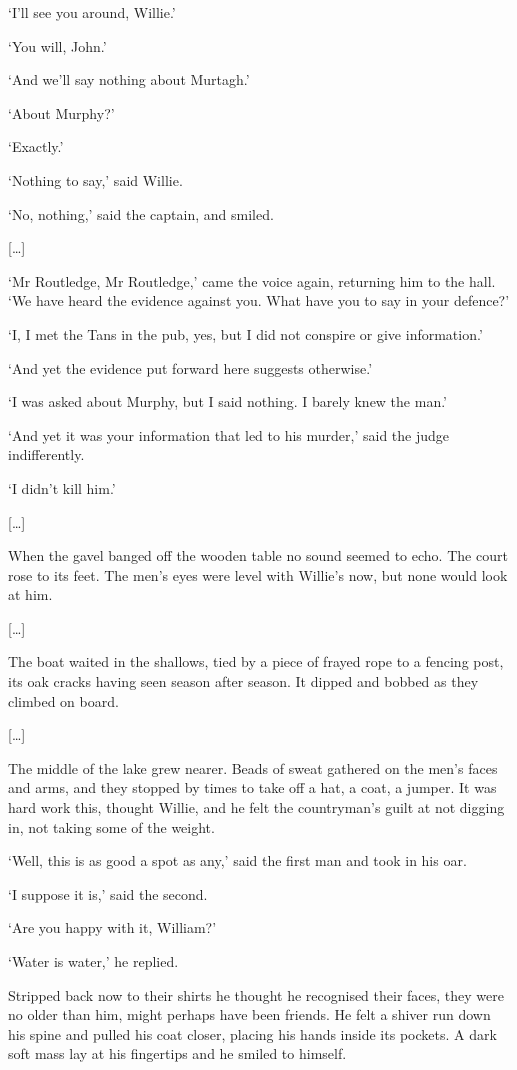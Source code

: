 \documentclass[10pt,a4paper]{article}
\begin{document}
‘I’ll see you around, Willie.’

‘You will, John.’

‘And we’ll say nothing about Murtagh.’

‘About Murphy?’

‘Exactly.’

‘Nothing to say,’ said Willie.

‘No, nothing,’ said the captain, and smiled.

[…] 

‘Mr Routledge, Mr Routledge,’ came the voice again, returning him to the hall. ‘We have heard the evidence against you. What have you to say in your defence?’

‘I, I met the Tans in the pub, yes, but I did not conspire or give information.’

‘And yet the evidence put forward here suggests otherwise.’

‘I was asked about Murphy, but I said nothing. I barely knew the man.’

‘And yet it was your information that led to his murder,’ said the judge indifferently.

‘I didn’t kill him.’

[…]

When the gavel banged off the wooden table no sound seemed to echo. The court rose to its feet. The men’s eyes were level with Willie’s now, but none would look at him.

[…] 

The boat waited in the shallows, tied by a piece of frayed rope to a fencing post, its oak cracks having seen season after season. It dipped and bobbed as they climbed on board. 

[…]

The middle of the lake grew nearer. Beads of sweat gathered on the men’s faces and arms, and they stopped by times to take off a hat, a coat, a jumper. It was hard work this, thought Willie, and he felt the countryman’s guilt at not digging in, not taking some of the weight.

‘Well, this is as good a spot as any,’ said the first man and took in his oar.

‘I suppose it is,’ said the second.

‘Are you happy with it, William?’

‘Water is water,’ he replied.

Stripped back now to their shirts he thought he recognised their faces, they were no older than him, might perhaps have been friends. He felt a shiver run down his spine and pulled his coat closer, placing his hands inside its pockets. A dark soft mass lay at his fingertips and he smiled to himself.
\end{document}
